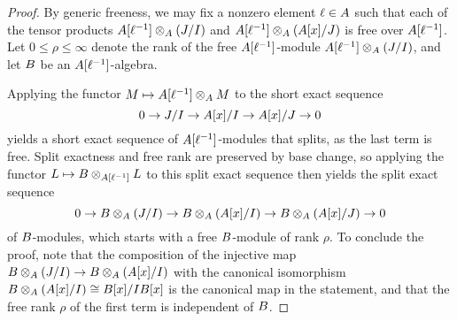 \documentclass{article}
\begin{document}
\begin{proof}
   By generic freeness, we may fix a nonzero element $\ell \in A$ such that each of the tensor products $A[\ell^{-1}] \otimes_A (J/I)$ and $A[\ell^{-1}] \otimes_A (A[x]/J)$ is free over $A[\ell^{-1}]$.
   Let $0 \leq \rho \leq \infty$ denote the rank of the free $A[\ell^{-1}]$-module $A[\ell^{-1}] \otimes_A (J/I)$, and let $B$ be an $A[\ell^{-1}]$-algebra.

Applying the functor $M \mapsto A[\ell^{-1}] \otimes_A M$ to the short exact sequence
\[ 0 \to J/I \to A[x] / I \to A[x]/J \to 0 \] 
yields a short exact sequence of $A[\ell^{-1}]$-modules that splits, as the last term is free.
Split exactness and free rank are preserved by base change, so applying the functor $L \mapsto B \otimes_{A[\ell^{-1}]} L$ to this split exact sequence then yields the split exact sequence
\[ 0 \to B \otimes_A (J/I) \to B \otimes_A (A[x]/I) \to B \otimes_A (A[x]/J) \to 0 \] 
of $B$-modules, which starts with a free $B$-module of rank $\rho$.  
To conclude the proof, note that the composition of the injective map $B \otimes_A (J/I)  \to B \otimes_A (A[x]/I)$ with the canonical isomorphism $B \otimes_A (A[x]/I) \cong B[x]/I B[x]$ is the canonical map in the statement, and that the free rank $\rho$ of the first term is independent of $B$.
\end{proof}
\end{document}
